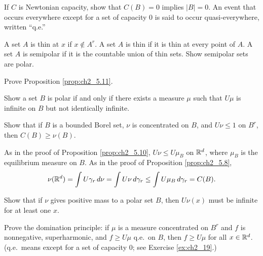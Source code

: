 \begin{exercise}\label{ex:ch2_19}
If $C$ is Newtonian capacity, show that $C(B) = 0$ implies $|B| = 0$. An event that occurs everywhere except for a set of capacity $0$ is said to occur quasi-everywhere, written ``q.e.''
\end{exercise}

\begin{exercise}\label{ex:ch2_20}
A set $A$ is thin at $x$ if $x \notin A^r$. A set $A$ is thin if it is thin at every point of $A$. A set $A$ is semipolar if it is the countable union of thin sets. Show semipolar sets are polar.
\end{exercise}

\begin{exercise}\label{ex:ch2_21}
Prove Proposition \ref{prop:ch2_5.11}.
\end{exercise}

\begin{exercise}\label{ex:ch2_22}
Show a set $B$ is polar if and only if there exists a measure $\mu$ such that $U\mu$ is infinite on $B$ but not identically infinite.
\end{exercise}

\begin{exercise}\label{ex:ch2_23}
Show that if $B$ is a bounded Borel set, $\nu$ is concentrated on $B$, and $U\nu \leq 1$ on $B^r$, then $C(B) \geq \nu(B)$.

\hint As in the proof of Proposition \ref{prop:ch2_5.10}, $U\nu \leq U\mu_B$ on $\mathbb{R}^d$, where $\mu_B$ is the equilibrium measure on $B$. As in the proof of Proposition \ref{prop:ch2_5.8},
\[
    \nu(\mathbb{R}^d) = \int U\gamma_r \,d\nu = \int U\nu \,d\gamma_r \leq \int U\mu_B \,d\gamma_r = C(B).
\]
\end{exercise}

\begin{exercise}\label{ex:ch2_24}
Show that if $\nu$ gives positive mass to a polar set $B$, then $U\nu(x)$ must be infinite for at least one $x$.
\end{exercise}

\begin{exercise}\label{ex:ch2_25}
Prove the domination principle: if $\mu$ is a measure concentrated on $B^r$ and $f$ is nonnegative, superharmonic, and $f \geq U\mu$ q.e.\ on $B$, then $f \geq U\mu$ for all $x \in \mathbb{R}^d$. (q.e.\ means except for a set of capacity $0$; see Exercise \ref{ex:ch2_19}.)
\end{exercise}

